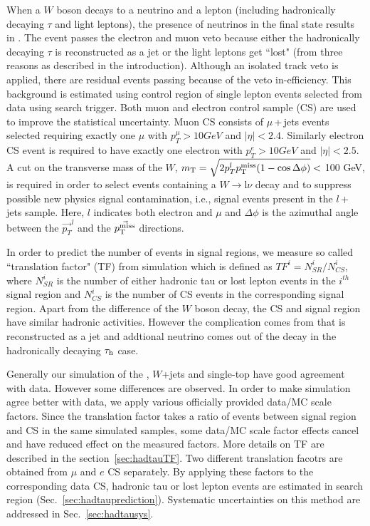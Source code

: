 When a $W$ boson decays to a neutrino and a lepton (including hadronically decaying $\tau$ and light leptons), the presence of neutrinos
in the final state results in \MET. The event passes the electron and muon veto because either the hadronically decaying $\tau$ is reconstructed
as a jet or the light leptons get ``lost" (from three reasons as described in the introduction). Although an isolated track veto is applied,
there are residual events passing because of the veto in-efficiency.
This background is estimated using control region of single lepton events selected from data using search trigger. Both muon and electron
control sample (CS) are used to improve the statistical uncertainty. Muon CS consists of $\mu$\,+\,jets events selected requiring exactly one
$\mu$ with $p_{T}^{\mu}>10 GeV$ and $|\eta|<2.4$. Similarly electron CS event is required to have exactly one electron with $p_{T}^{e}>10 GeV$ and $|\eta|<2.5$.
A cut on the transverse mass of the $W$, $m_\mathrm{T}=\sqrt{2p_{T}^{l}p^{\rm miss}_{\rm T}(1-\cos\Delta\phi)}<$ 100 GeV, is required in order to select events
containing a $W\to$l$\nu$ decay and to suppress possible new physics signal contamination, i.e., signal events present in the $l$\,+\,jets sample.
Here, $l$ indicates both electron and $\mu$ and $\Delta\phi$ is the azimuthal angle between the $\vec{p_{T}}^l$ and the $\vec{p^{\rm miss}_{\rm T}}$ directions.

In order to predict the number of events in signal regions, we measure so called ``translation factor" (TF) from simulation which is defined as $TF^{i} = N_{SR}^{i}/N_{CS}^{i}$,
where $N_{SR}^{i}$ is the number of either hadronic tau or lost lepton events in the $i^{th}$ signal region and $N_{CS}^{i}$ is the number of CS events in the corresponding signal region.
Apart from the difference of the $W$ boson decay, the CS and signal region have similar hadronic activities. However the complication comes from that \tauh is reconstructed as a jet
and addtional neutrino comes out of the \tauh decay in the hadronically decaying $\tau_\mathrm{h}$ case.

Generally our simulation of the \ttbar , $W$+jets and single-top have good agreement with data. However some differences are observed. In order to make simulation agree better
with data, we apply various officially provided data/MC scale factors. Since the translation factor takes a ratio of events between signal region and CS in the same simulated samples,
some data/MC scale factor effects cancel and have reduced effect on the measured factors. More details on TF are described in the section~\ref{sec:hadtauTF}. Two different
translation facotrs are obtained from $\mu$ and $e$ CS separately. By applying these factors to the corresponding data CS, hadronic tau or lost lepton events are estimated in search region
(Sec.~\ref{sec:hadtauprediction}). Systematic uncertainties on this method are addressed in Sec.~\ref{sec:hadtausys}.

